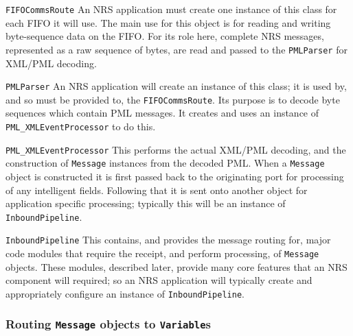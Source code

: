 \documentclass[pdftex,a4paper]{article}
\newif\ifpdf
\newcommand{\code}[1]{{\tt \small #1}}
\begin{document}
\begin{description}

\item{\code{FIFOCommsRoute}} An NRS application must create one instance
  of this class for each FIFO it will use. The main use for this object
  is for reading and writing byte-sequence data on the FIFO. For its
  role here, complete NRS messages, represented as a raw sequence of
  bytes, are read and passed to the \code{PMLParser} for XML/PML
  decoding.

\item{\code{PMLParser}} An NRS application will create an instance of
  this class; it is used by, and so must be provided to, the
  \code{FIFOCommsRoute}. Its purpose is to decode byte sequences which
  contain PML messages. It creates and uses an instance of
  \code{PML\_XMLEventProcessor} to do this.

\item{\code{PML\_XMLEventProcessor}} This performs the actual XML/PML
decoding, and the construction of \code{Message} instances from the
decoded PML. When a \code{Message} object is constructed it is first
passed back to the originating port for processing of any intelligent
fields. Following that it is sent onto another object for application
specific processing; typically this will be an instance of
\code{InboundPipeline}.

\item{\code{InboundPipeline}} This contains, and provides the message
  routing for, major code modules that require the receipt, and perform
  processing, of \code{Message} objects. These modules, described later,
  provide many core features that an NRS component will required; so an
  NRS application will typically create and appropriately configure an
  instance of \code{InboundPipeline}.

\end{description}


\ifpdf
\begin{figure}[htb]
  \begin{center}
    \texttt{[image: java\_comms\_classes.pdf]}
    \caption{Some of the classes and relationships involved in receiving
    byte sequences from a FIFO. Note that not all methods and data
    members are shown.}
    \label{pic:java_comms_classes}
  \end{center}
\end{figure}
\fi

\subsubsection{Routing \code{Message} objects to \code{Variable}s}
\end{document}
